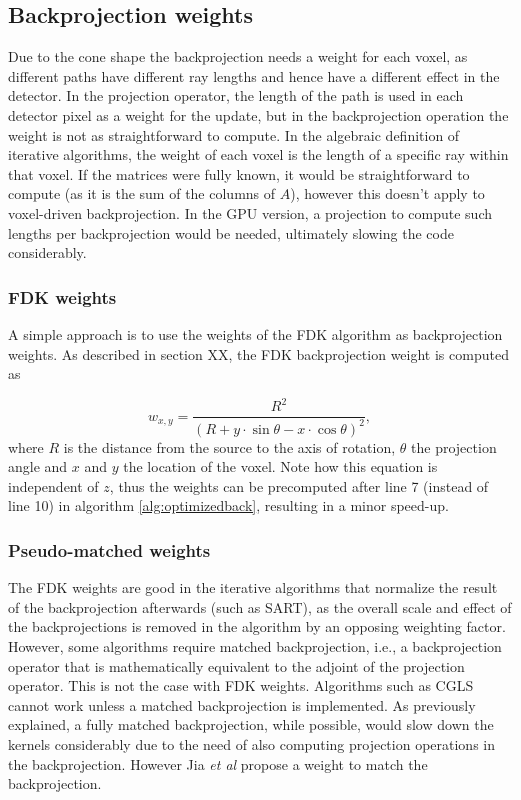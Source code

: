 \subsection{Backprojection weights}\label{sec:weights}

Due to the cone shape the backprojection needs a weight for each voxel, as different paths have different ray lengths and hence have a different effect in the detector. In the projection operator, the length of the path is used in each detector pixel as a weight for the update, but in the backprojection operation the weight is not as straightforward to compute. In the algebraic definition of iterative algorithms, the weight of each voxel is the length of a specific ray within that voxel. If the matrices were fully known, it would be straightforward to compute (as it is the sum of the columns of $A$), however this doesn't apply to voxel-driven backprojection. In the GPU version, a projection to compute such lengths per backprojection would be needed, ultimately slowing the code considerably.

\subsubsection*{FDK weights}
A simple approach is to use the weights of the FDK algorithm as backprojection weights. As described in section XX, the FDK backprojection weight is computed as

\begin{equation}
w_{x,y}=\frac{R^2}{(R+y\cdot \sin\theta-x\cdot\cos\theta)^2},
\end{equation}
where $R$ is the distance from the source to the axis of rotation, $\theta$ the projection angle and $x$ and $y$ the location of the voxel. Note how this equation is independent of $z$, thus the weights can be precomputed after line 7 (instead of line 10) in algorithm \ref{alg:optimizedback}, resulting in a minor speed-up.


\subsubsection*{Pseudo-matched weights}
The FDK weights are good in the iterative algorithms that normalize the result of the backprojection afterwards (such as SART), as the overall scale and effect of the backprojections is removed in the algorithm by an opposing weighting factor. However, some algorithms require matched backprojection, i.e., a backprojection operator that is mathematically equivalent to the adjoint of the projection operator. This is not the case with FDK weights. Algorithms such as CGLS cannot work unless a matched backprojection is implemented. As previously explained, a fully matched backprojection, while possible, would slow down the kernels considerably due to the need of also computing projection operations in the backprojection. However Jia \textit{et al}\cite{jia2011gpu} propose a weight to match the backprojection.

